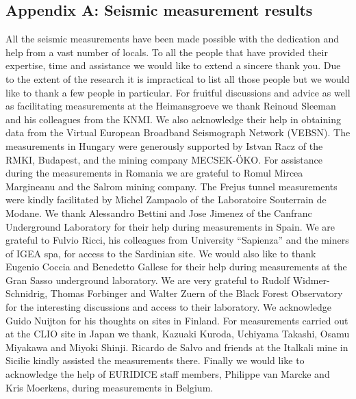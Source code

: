 \FloatBarrier
\subsection{Appendix A: Seismic measurement results}
All the seismic measurements have been made possible with the dedication and help from a vast number of locals. To all the people that have provided their expertise, time and assistance we would like to extend a sincere thank you. Due to the extent of the research it is impractical to list all those people but we would like to thank a few people in particular. For fruitful discussions and advice as well as facilitating measurements at the Heimansgroeve we thank Reinoud Sleeman and his colleagues from the KNMI. We also acknowledge their help in obtaining data from the Virtual European Broadband Seismograph Network (VEBSN). The measurements in Hungary were generously supported by Istvan Racz of the RMKI, Budapest, and the mining company MECSEK-\"OKO. For assistance during the measurements in Romania we are grateful to Romul Mircea Margineanu and the Salrom mining company. The Frejus tunnel measurements were kindly facilitated by Michel Zampaolo of the Laboratoire Souterrain de Modane. We thank Alessandro Bettini and Jose Jimenez of the Canfranc Underground Laboratory for their help during measurements in Spain. We are grateful to Fulvio Ricci, his colleagues from University ``Sapienza'' and the miners of IGEA spa, for access to the Sardinian site. We would also like to thank Eugenio Coccia and Benedetto Gallese for their help during measurements at the Gran Sasso underground laboratory. We are very grateful to Rudolf Widmer-Schnidrig, Thomas Forbinger and Walter Zuern of the Black Forest Observatory for the interesting discussions and access to their laboratory. We acknowledge Guido Nuijton for his thoughts on sites in Finland. For measurements carried out at the CLIO site in Japan we thank, Kazuaki Kuroda, Uchiyama Takashi, Osamu Miyakawa and Miyoki Shinji. Ricardo de Salvo and friends at the Italkali mine in Sicilie kindly assisted the measurements there. Finally we would like to acknowledge the help of EURIDICE staff members, Philippe van Marcke and Kris Moerkens, during measurements in Belgium.

\pagebreak
\FloatBarrier
